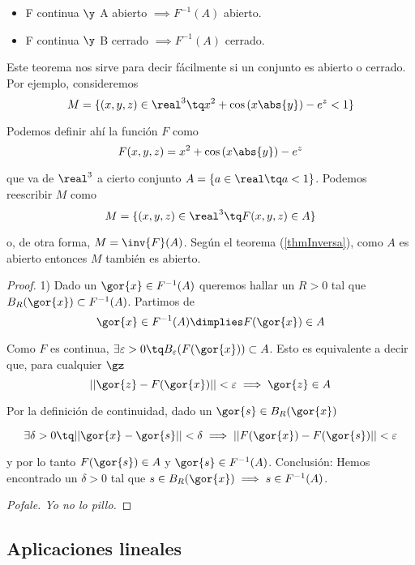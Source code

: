 \documentclass{apuntes}
\begin{document}
\begin{theorem}\par\noindent\par
\label{thmInversa}
\begin{itemize}
\item F continua $\y$ A abierto $\implies F^{-1} (A)$ abierto.
\item F continua $\y$ B cerrado $\implies F^{-1} (A)$ cerrado.
\end{itemize}
\end{theorem}

Este teorema nos sirve para decir fácilmente si un conjunto es abierto o cerrado. Por ejemplo, consideremos
 \[ M=\{(x,y,z) \in \real^3 \tq x^2 + \cos\left(x\abs{y}\right) - e^z < 1 \} \]

Podemos definir ahí la función $F$ como 
\[ F(x,y,z) = x^2 + \cos\left(x\abs{y}\right) - e^z\]

que va de $\real^3$ a cierto conjunto $A = \{ a \in \real \tq a < 1 \}$. Podemos reescribir $M$ como
\[M=\{(x,y,z) \in \real^3 \tq  F(x,y,z) \in A\}\]

o, de otra forma, $M = \inv{F}(A)$. Según el teorema (\ref{thmInversa}), como $A$ es abierto entonces $M$ también es abierto.

\begin{proof}
1) Dado un $\gor{x} \in F^{-1} (A)$ queremos hallar un $R>0$ tal que $B_R(\gor{x})\subset F^{-1} (A)$. Partimos de 
\[\gor{x}\in F^{-1} (A) \dimplies F(\gor{x})\in A\]

Como $F$ es continua, $\exists \varepsilon>0 \tq B_{\varepsilon}(F(\gor{x}))\subset A$. Esto es equivalente a decir que, para cualquier $\gz$
\[ ||\gor{z}-F(\gor{x})|| < \varepsilon \implies \gor{z}\in A\]

Por la definición de continuidad, dado un $\gor{s}\in B_R(\gor{x})$ 

\[ \exists \delta > 0 \tq ||\gor{x}-\gor{s}||<\delta \implies ||F(\gor{x})-F(\gor{s})||< \varepsilon \]

y por lo tanto $F(\gor{s}) \in A$ y $\gor{s} \in F^{-1} (A)$.
Conclusión: Hemos encontrado un $\delta > 0$ tal que $s \in B_R(\gor{x}) \implies s \in F^{-1} (A)$.

\textit{Pofale. Yo no lo pillo.}
\end{proof}


\subsection{Aplicaciones lineales}
\end{document}
